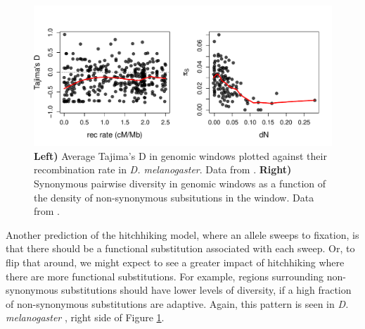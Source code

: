 \begin{figure}
\begin{center}
\includegraphics[width=\textwidth]{Journal_figs/recom_selection/Andolfatto_subs_vs_dN/Tajimas_D_subs_vs_dN.pdf}
\end{center}
\caption{{\bf Left)} Average Tajima's D in genomic windows plotted
  against their recombination rate in \textit{D. melanogaster}. Data
  from \citet{Shapiro:07}. {\bf Right)} Synonymous pairwise diversity
  in genomic windows  as a function of the density of non-synonymous
  subsitutions in the window. Data from \citet{Andolfatto:07}. } \label{fig:Tajimas_D_dN_pi}
\end{figure}

Another prediction of the hitchhiking model, where an allele sweeps to
fixation, is that there should be a functional substitution associated with each
sweep. Or, to flip that around, we might expect to see a greater impact
of hitchhiking where there are more functional substitutions. 
For example, regions surrounding non-synonymous substitutions should have lower levels of
diversity, if a high fraction of non-synonymous substitutions are adaptive. Again, this pattern is seen in \textit{D. melanogaster}
\citep{Andolfatto:07, Macpherson:07,Sattath:11}, right side of
Figure \ref{fig:Tajimas_D_dN_pi}.


